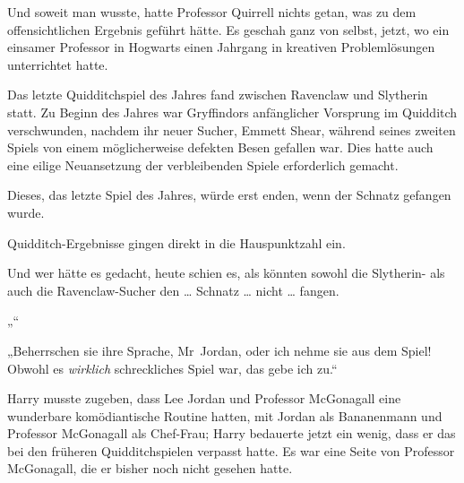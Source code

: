 Und soweit man wusste, hatte Professor Quirrell nichts getan, was zu dem offensichtlichen Ergebnis geführt hätte. Es geschah ganz von selbst, jetzt, wo ein einsamer Professor in Hogwarts einen Jahrgang in kreativen Problemlösungen unterrichtet hatte.

Das letzte Quidditchspiel des Jahres fand zwischen Ravenclaw und Slytherin statt. Zu Beginn des Jahres war Gryffindors anfänglicher Vorsprung im Quidditch verschwunden, nachdem ihr neuer Sucher, Emmett Shear, während seines zweiten Spiels von einem möglicherweise defekten Besen gefallen war. Dies hatte auch eine eilige Neuansetzung der verbleibenden Spiele erforderlich gemacht.

Dieses, das letzte Spiel des Jahres, würde erst enden, wenn der Schnatz gefangen wurde.

Quidditch-Ergebnisse gingen direkt in die Hauspunktzahl ein.

Und wer hätte es gedacht, heute schien es, als könnten sowohl die Slytherin- als auch die Ravenclaw-Sucher den … Schnatz … nicht … fangen.

„“

„Beherrschen sie ihre Sprache, Mr~Jordan, oder ich nehme sie aus dem Spiel! Obwohl es \emph{wirklich} schreckliches Spiel war, das gebe ich zu.“

Harry musste zugeben, dass Lee Jordan und Professor McGonagall eine wunderbare komödiantische Routine hatten, mit Jordan als Bananenmann und Professor McGonagall als Chef-Frau; Harry bedauerte jetzt ein wenig, dass er das bei den früheren Quidditchspielen verpasst hatte. Es war eine Seite von Professor McGonagall, die er bisher noch nicht gesehen hatte.

